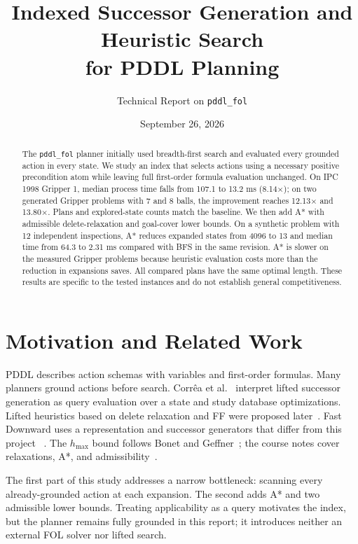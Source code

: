 \documentclass[10pt,a4paper]{article}
\title{Indexed Successor Generation and Heuristic Search\\
for PDDL Planning}
\author{Technical Report on \texttt{pddl\_fol}}
\date{September 26, 2026}
\begin{document}
\maketitle

\begin{abstract}
The \texttt{pddl\_fol} planner initially used breadth-first search and evaluated
every grounded action in every state. We study an index that selects actions
using a necessary positive precondition atom while leaving full first-order
formula evaluation unchanged. On IPC 1998 Gripper 1, median process time falls
from 107.1 to 13.2 ms (8.14$\times$); on two generated Gripper problems with 7
and 8 balls, the improvement reaches 12.13$\times$ and 13.80$\times$. Plans
and explored-state counts match the baseline. We then add A* with admissible
delete-relaxation and goal-cover lower bounds. On a synthetic problem with 12
independent inspections, A* reduces expanded states from 4096 to 13 and median
time from 64.3 to 2.31 ms compared with BFS in the same revision. A* is slower
on the measured Gripper problems because heuristic evaluation costs more than
the reduction in expansions saves. All compared plans have the same optimal
length. These results are specific to the tested instances and do not establish
general competitiveness.
\end{abstract}

\section{Motivation and Related Work}
PDDL describes action schemas with variables and first-order formulas. Many
planners ground actions before search. Corr\^ea et al.~\cite{correa2020}
interpret lifted successor generation as query evaluation over a state and
study database optimizations. Lifted heuristics based on delete relaxation and
FF were proposed later~\cite{correa2021,correa2022}. Fast Downward uses a
representation and successor generators that differ from this project
~\cite{helmert2006}. The $h_{\max}$ bound follows Bonet and
Geffner~\cite{bonet2001}; the course notes cover relaxations, A*, and
admissibility~\cite{manciniB2,manciniA3}.

The first part of this study addresses a narrow bottleneck: scanning every
already-grounded action at each expansion. The second adds A* and two admissible
lower bounds. Treating applicability as a query motivates the index, but the
planner remains fully grounded in this report; it introduces neither an
external FOL solver nor lifted search.
\end{document}
